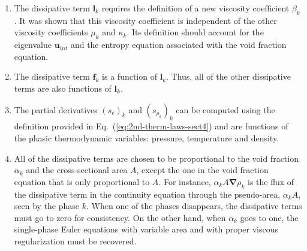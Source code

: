 \documentclass[preprint,10pt]{elsarticle}
\newcommand{\grad}{\mbold{\nabla}}
\newcommand{\mbold}[1]{\boldsymbol#1}
\newcommand{\eqt}[1]{Eq.~(\ref{#1})}                     %
\newcommand{\tcr}[1]{\textcolor{red}{#1}}
\begin{document}
\begin{enumerate}
\item {The dissipative term $\mbold l_k$ requires the definition of a new viscosity
    coefficient $\beta_k$. It was shown that this viscosity coefficient is independent of
    the other viscosity coefficients $\mu_k$ and $\kappa_k$. Its definition should
    account for the eigenvalue $\mbold u_{int}$ and  the entropy equation associated with the void fraction equation.}

\item {The dissipative term $\mbold f_k$ is a function of $\mbold l_k$. Thus, all of the other
    dissipative terms are also functions of $\mbold l_k$.}

\item {The partial derivatives $(s_e)_k$ and $(s_{\rho_k})_k$ can be computed using the
    definition provided in \eqt{eq:2nd-therm-laws-sect4} and are functions of the phasic thermodynamic
    variables: pressure, temperature and density.}

\item {All of the dissipative terms are chosen to be proportional to the void
    fraction $\alpha_k$ and the cross-sectional area $A$, except the one in the void fraction equation that is only proportional to $A$. For instance, $\alpha_k A \grad \rho_k$ is the
    flux of the dissipative term in the continuity equation through the pseudo-area, $\alpha_k A$, seen
    by the phase $k$. When one of the phases disappears, the dissipative terms
    must go to zero for consistency. On the other hand, when $\alpha_k$ goes to one,
    the single-phase Euler equations with variable area and with proper viscous regularization must be recovered. }    


\end{enumerate}
\end{document}
